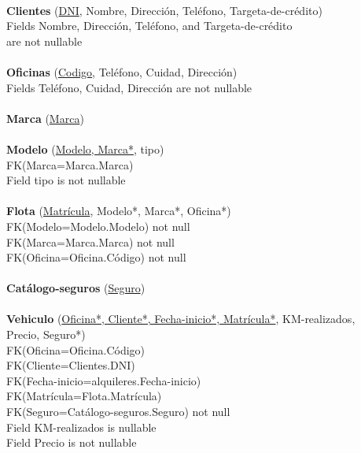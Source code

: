 \documentclass[a4paper,10pt]{article}
\newcommand\tab[1][1cm]{\hspace*{#1}}
\begin{document}
\paragraph{}
{\bf Clientes} (\underline{DNI}, Nombre, Dirección, Teléfono, Targeta-de-crédito)\\
  \tab Fields Nombre, Dirección, Teléfono, and Targeta-de-crédito\\
  \tab\tab are not nullable

\paragraph{}
{\bf Oficinas} (\underline{Codigo}, Teléfono, Cuidad, Dirección)\\
  \tab Fields Teléfono, Cuidad, Dirección are not nullable

\paragraph{}
{\bf Marca} (\underline{Marca})

\paragraph{}
{\bf Modelo} (\underline{Modelo, Marca*}, tipo)\\
  \tab FK(Marca=Marca.Marca)\\
  \tab Field tipo is not nullable
  
\paragraph{}
{\bf Flota} (\underline{Matrícula}, Modelo*, Marca*, Oficina*)\\
  \tab FK(Modelo=Modelo.Modelo) not null\\
  \tab FK(Marca=Marca.Marca) not null\\
  \tab FK(Oficina=Oficina.Código) not null


\paragraph{}
{\bf Catálogo-seguros} (\underline{Seguro})

\paragraph{}
{\bf Vehiculo} (\underline{Oficina*, Cliente*, Fecha-inicio*, Matrícula*}, KM-realizados, \\\tab\tab Precio, Seguro*)\\
  \tab FK(Oficina=Oficina.Código)\\
  \tab FK(Cliente=Clientes.DNI)\\
  \tab FK(Fecha-inicio=alquileres.Fecha-inicio)\\
  \tab FK(Matrícula=Flota.Matrícula)\\
  \tab FK(Seguro=Catálogo-seguros.Seguro) not null\\
  \tab Field KM-realizados is nullable\\
  \tab Field Precio is not nullable
\end{document}
